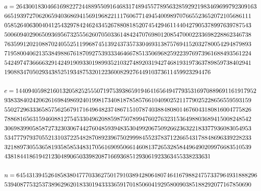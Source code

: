 \documentclass{article}
\theoremstyle{break}
\begin{document}
\begin{enumerate}
\[\begin{aligned}
                &a=26430018304661698227244889550916468317489455778956328592921983469699792309163\\
                &6651939727062065940368694156919682211176067714945400989707665523652072105686111\\
                &0585264063004041254329784246243452678808185207454294611440427905378997639787543\\
                &5006094029065093695673255562607050336148424707698012085470002233698228862346738\\
                &7635991202108870240552511996874513924373573304693138757694152032780054294879893\\
                &7195800406213538498867618709275393334646678513506968259223976973961688493561224\\
                &5424974736666329142491909330198993521032748920319427468193197363789859738402941\\
                &190883470502934385251934875320122360082927644910373611459923294476\\
                \leavevmode\\                
                &e=14409405982160132058252555071975393865919464165649477935316970889691161917952\\
                &9383384024206261698498692401998173408187858576610409025211779025228656559593159\\
                &5502729633365857562567917164964823748671510787403884808014676043180816004775826\\
                &7886816563159460881275453304962088598750789947602763231536498803689415008248542\\
                &3069839905858727323030674427604859394835304992067509266236322183377936083054953\\
                &5347779793705521310372254828708923967502999845523783712266543178848696339228233\\
                &3218897305536581935858534831705616909506614608137265328584496490209976683510539\\
                &438184418619421230489065033982087166936851293061923363455338233631\\
                \leavevmode\\
                &n=64543139452648583804777033627501791038942806480746416798824757337964931888296\\
                &5394087753253738962962018330194333365917018506041929580090385188292077167850690\\

\end{aligned}\]
\end{enumerate}
\end{document}
